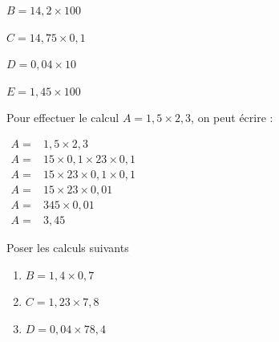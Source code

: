 \documentclass[a4paper]{book}
\begin{document}
\begin{exercice}
\begin{enumerate}[leftmargin=*]
\begin{minipage}{0.18\linewidth}
                \vspace{1cm}
            \end{minipage}
            \hfill \vline \hfill
            \begin{minipage}{0.18\linewidth}
                $B=14,2\times100$

                \vspace{1cm}
            \end{minipage}
            \hfill \vline \hfill
            \begin{minipage}{0.18\linewidth}
                $C=14,75\times0,1$

                \vspace{1cm}
            \end{minipage}
            \hfill \vline \hfill
            \begin{minipage}{0.18\linewidth}
                $D=0,04\times10$

                \vspace{1cm}
            \end{minipage}
            \hfill \vline \hfill
            \begin{minipage}{0.18\linewidth}
                $E=1,45\times100$

                \vspace{1cm}
            
            \end{minipage}
            
        \end{enumerate}
    \end{exercice}


    \begin{exercice}
        Pour effectuer le calcul $A=1,5\times2,3$, on peut écrire : 

        $\begin{array}{ll}
            A= & 1,5\times2,3 \\
            A= & 15\times0,1\times23\times0,1 \\
            A= & 15\times23\times0,1\times0,1 \\
            A= & 15\times23\times0,01 \\
            A= & 345 \times 0,01 \\
            A= & 3,45
        \end{array}$

        Poser les calculs suivants 
        \begin{enumerate}
            \item $B=1,4\times0,7$

            \item $C=1,23\times7,8$

            \item $D=0,04\times78,4$
        \end{enumerate}
    \end{exercice}
\end{document}
